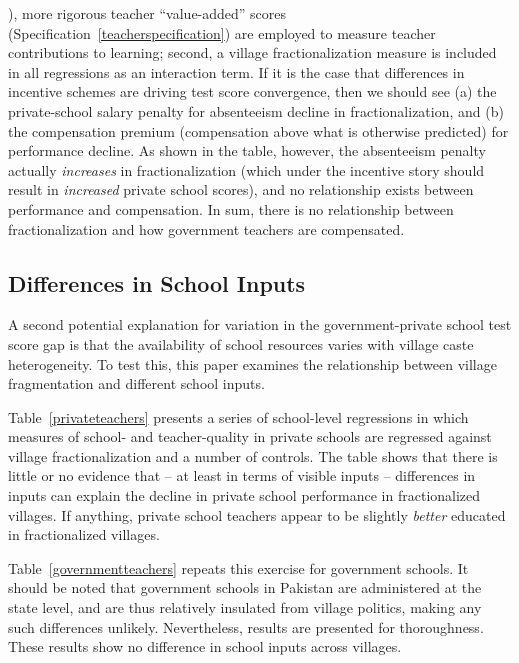 \documentclass[Eubank_pk_ethnic_sorting.tex]{subfiles}
\begin{document}
), more rigorous teacher ``value-added'' scores (Specification~\ref{teacherspecification}) are employed to measure teacher contributions to learning; second, a village fractionalization measure is included in all regressions as an interaction term. If it is the case that differences in incentive schemes are driving test score convergence, then we should see (a) the private-school salary penalty for absenteeism decline in fractionalization, and (b) the compensation premium (compensation above what is otherwise predicted) for performance decline. As shown in the table, however, the absenteeism penalty actually \emph{increases} in fractionalization (which under the incentive story should result in \emph{increased} private school scores), and no relationship exists between performance and compensation. In sum, there is no relationship between fractionalization and how government teachers are compensated.





\subsection{Differences in School Inputs}

A second potential explanation for variation in the government-private school test score gap is that the availability of school resources varies with village caste heterogeneity. To test this, this paper examines the relationship between village fragmentation and different school inputs. 

Table~\ref{privateteachers} presents a series of school-level regressions in which measures of school- and teacher-quality in private schools are regressed against village fractionalization and a number of controls. The table shows that there is little or no evidence that -- at least in terms of visible inputs -- differences in inputs can explain the decline in private school performance in fractionalized villages. If anything, private school teachers appear to be slightly \emph{better} educated in fractionalized villages.


Table~\ref{governmentteachers} repeats this exercise for government schools. It should be noted that government schools in Pakistan are administered at the state level, and are thus relatively insulated from village politics, making any such differences unlikely. Nevertheless, results are presented for thoroughness. These results show no difference in school inputs across villages. 


\end{document}
